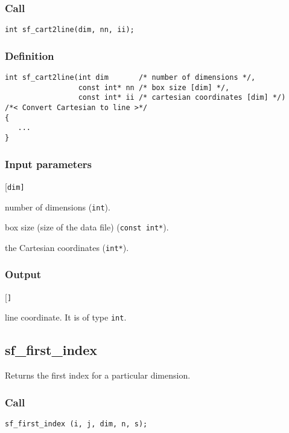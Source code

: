 \subsubsection*{Call}
\begin{verbatim}int sf_cart2line(dim, nn, ii);\end{verbatim}


\subsubsection*{Definition}
\begin{verbatim}
int sf_cart2line(int dim       /* number of dimensions */, 
                 const int* nn /* box size [dim] */, 
                 const int* ii /* cartesian coordinates [dim] */) 
/*< Convert Cartesian to line >*/
{
   ...
}
\end{verbatim}


\subsubsection*{Input parameters}
\begin{desclist}{\tt }{\quad}[\tt dim]
   \setlength\itemsep{0pt}
   \item[dim] number of dimensions (\texttt{int}).  
   \item[nn]  box size (size of the data file) (\texttt{const int*}).  
   \item[ii]  the Cartesian coordinates (\texttt{int*}).  
\end{desclist}

\subsubsection*{Output}
\begin{desclist}{\tt }{\quad}[\tt ]
   \setlength\itemsep{0pt}
   \item[i] line coordinate. It is of type \texttt{int}.
\end{desclist}




\subsection{{sf\_first\_index}}\label{sec:sf_first_index}
Returns the first index for a particular dimension.

\subsubsection*{Call}
\begin{verbatim}sf_first_index (i, j, dim, n, s);\end{verbatim}


